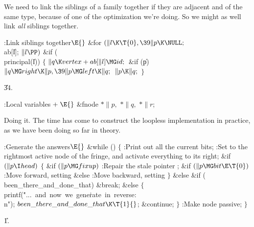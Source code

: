 We need to link the siblings of a family together if
they are adjacent and
of the same type, because of one of the optimization we're doing.
So we might as well link {\it all\/} siblings together.

\Y\B\4:Link siblings together\X${}\E{}$\6
\&{for} ${}(\|l\K\T{0},\39\|p\K\NULL;{}$ \\{ab}[\|l]; ${}\|l\PP){}$\1\6
\&{if} (\\{principal}(\|l))\5
${}\{{}$\1\6
${}\|q\K\\{vertex}+\\{ab}[\|l]\MG\\{id};{}$\6
\&{if} (\|p)\1\5
${}\|q\MG\\{right}\K\|p,\39\|p\MG\\{left}\K\|q;{}$\2\6
${}\|p\K\|q;{}$\6
\4${}\}{}$\2\2\par
\U34.\fi

\B{}:Local variables\X${}\mathrel+\E{}$\6
\&{fnode} ${}{*}\|p,{}$ ${}{*}\|q,{}$ ${}{*}\|r{}$;\par
\fi

Doing it. The time has come to construct the loopless
implementation
in practice, as we have been doing so far in theory.

\Y\B\4:Generate the answers\X${}\E{}$\6
\&{while} ()\5
${}\{{}$\1\6
:Print out all the current bits\X;\6
:Set  to the rightmost active node of the fringe, and activate
everything to its right\X;\6
\&{if} ${}(\|p\I\\{head}){}$\5
${}\{{}$\1\6
\&{if} ${}(\|p\MG\\{fixup}){}$\1\5
:Repair the stale pointer \X;\2\6
\&{if} ${}(\|p\MG\\{bit}\E\T{0}){}$\1\5
:Move forward, setting \X\2\6
\&{else}\1\5
:Move backward, setting \X\2\6
\4${}\}{}$\5
\2\&{else} \&{if} (\\{been\_there\_and\_done\_that})\1\5
\&{break};\2\6
\&{else}\5
${}\{{}$\1\6
\\{printf}(\.{"...\ and\ now\ we\ gene}\)\.{rate\ in\ reverse:\\n"});\6
${}\\{been\_there\_and\_done\_that}\K\T{1}{}$;\5
\&{continue};\6
\4${}\}{}$\2\6
:Make node  passive\X;\6
\4${}\}{}$\2\par
\U1.\fi

